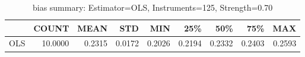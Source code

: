 \begin{table}[ht]
\centering
\caption{bias summary: Estimator=OLS, Instruments=125, Strength=0.70}
\begin{tabular}{lrrrrrrrr}
\toprule
 & COUNT & MEAN & STD & MIN & 25\% & 50\% & 75\% & MAX \\
\midrule
OLS & 10.0000 & 0.2315 & 0.0172 & 0.2026 & 0.2194 & 0.2332 & 0.2403 & 0.2593 \\
\bottomrule
\end{tabular}
\end{table}
